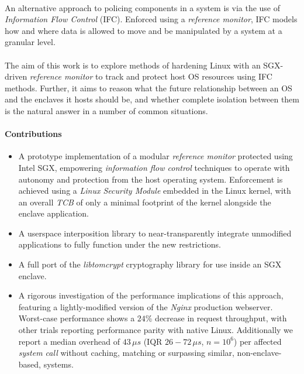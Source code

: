\paragraph{} An alternative approach to policing components in a system is via the use of \textit{Information Flow Control} (IFC). Enforced using a \textit{reference monitor}, IFC models how and where data is allowed to move and be manipulated by a system at a granular level.

\paragraph{} The aim of this work is to explore methods of hardening Linux with an SGX-driven \textit{reference monitor} to track and protect host OS resources using IFC methods. Further, it aims to reason what the future relationship between an OS and the enclaves it hosts should be, and whether complete isolation between them is the natural answer in a number of common situations.


\paragraph{Contributions}
\begin{itemize}
    \item A prototype implementation of a modular \textit{reference monitor} protected using Intel SGX, empowering \textit{information flow control} techniques to operate with autonomy and protection from the host operating system. Enforcement is achieved using a \textit{Linux Security Module} embedded in the Linux kernel, with an overall \textit{TCB} of only a minimal footprint of the kernel alongside the enclave application.
    \item A userspace interposition library to near-transparently integrate unmodified applications to fully function under the new restrictions.
    \item A full port of the \textit{libtomcrypt} cryptography library for use inside an SGX enclave.
    \item A rigorous investigation of the performance implications of this approach, featuring a lightly-modified version of the \textit{Nginx} production webserver. Worst-case performance shows a $24$\% decrease in request throughput, with other trials reporting performance parity with native Linux. Additionally we report a median overhead of $43\,\mu s$ (IQR $26-72\,\mu s$, $n = 10^6$) per affected \textit{system call} without caching, matching or surpassing similar, non-enclave-based, systems.
\end{itemize}